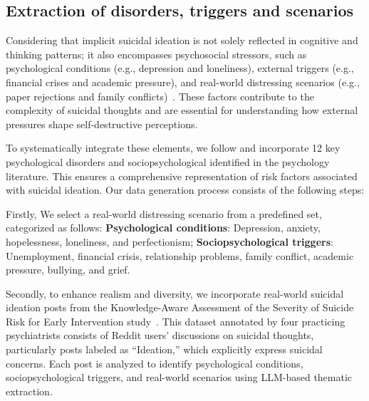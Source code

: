 

\subsection{Extraction of disorders, triggers and scenarios}

Considering that implicit suicidal ideation is not solely reflected in cognitive and thinking patterns; it also encompasses psychosocial stressors, such as psychological conditions (e.g., depression and loneliness), external triggers (e.g., financial crises and academic pressure), and real-world distressing scenarios (e.g., paper rejections and family conflicts)~\cite{Tull2022}. These factors contribute to the complexity of suicidal thoughts and are essential for understanding how external pressures shape self-destructive perceptions.

To systematically integrate these elements, we follow \cite{method14} and incorporate 12 key psychological disorders and sociopsychological identified in the psychology literature. This ensures a comprehensive representation of risk factors associated with suicidal ideation. Our data generation process consists of the following steps:

Firstly, We select a real-world distressing scenario from a predefined set, categorized as follows: \textbf{Psychological conditions}: Depression, anxiety, hopelessness, loneliness, and perfectionism; \textbf{Sociopsychological triggers}: Unemployment, financial crisis, relationship problems, family conflict, academic pressure, bullying, and grief.


Secondly, to enhance realism and diversity, we incorporate real-world suicidal ideation posts from the Knowledge-Aware Assessment of the Severity of Suicide Risk for Early Intervention study~\cite{method15}. This dataset annotated by four practicing psychiatrists consists of Reddit users' discussions on suicidal thoughts, particularly posts labeled as ``Ideation,'' which explicitly express suicidal concerns. Each post is analyzed to identify psychological conditions, sociopsychological triggers, and real-world scenarios using LLM-based thematic extraction.

